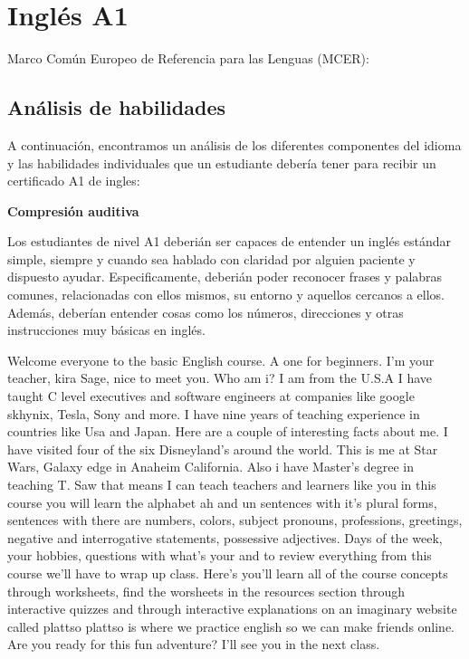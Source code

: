 \chapter{Ingl\'es A1}

Marco Com\'un Europeo de Referencia para las Lenguas (MCER): 

\section{An\'alisis de habilidades}

A continuaci\'on, encontramos un an\'alisis de los diferentes componentes del idioma y las habilidades individuales que un estudiante deber\'ia tener para recibir un certificado A1 de ingles: 

{\bf Compresi\'on auditiva}

Los estudiantes de nivel A1 deberi\'an ser capaces de entender un ingl\'es est\'andar simple, siempre y cuando sea hablado con claridad por alguien paciente y dispuesto ayudar. Especificamente, deberi\'an poder reconocer frases y palabras comunes, relacionadas con ellos mismos, su entorno y aquellos cercanos a ellos. Adem\'as, deber\'ian entender cosas como los n\'umeros, direcciones y otras instrucciones muy b\'asicas en ingl\'es.

Welcome everyone to the basic English course. A one for beginners. I'm your teacher, kira Sage, nice to meet you. Who am i? I am from the U.S.A I have taught C level executives and software engineers at companies like google skhynix, Tesla, Sony and more. I have nine years of teaching experience in countries like Usa and Japan. Here are a couple of interesting facts about me. I have visited four of the six Disneyland's around the world. This is me at Star Wars, Galaxy edge in Anaheim California. Also i have Master's degree in teaching T. Saw that means I can teach teachers and learners like you in this course you will learn the alphabet ah and un sentences with it's plural forms, sentences with there are numbers, colors, subject pronouns, professions, greetings, negative and interrogative statements, possessive adjectives. Days of the week, your hobbies, questions with what's your and to review everything from this course we'll have to wrap up class. Here's you'll learn all of the course concepts through worksheets, find the worsheets in the resources section through interactive quizzes and through interactive explanations on an imaginary website called plattso plattso is where we practice english so we can make friends online. Are you ready for this  fun adventure? I'll see you in the next class.


